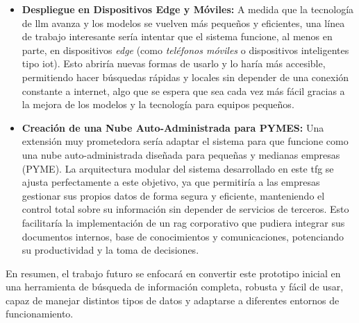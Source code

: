 \begin{itemize}
\item \textbf{Despliegue en Dispositivos Edge y Móviles:} A medida que la tecnología de \gls{llm} avanza y los modelos se vuelven más pequeños y eficientes, una línea de trabajo interesante sería intentar que el sistema funcione, al menos en parte, en dispositivos \textit{edge} (como \textit{teléfonos móviles} o dispositivos inteligentes tipo \gls{iot}). Esto abriría nuevas formas de usarlo y lo haría más accesible, permitiendo hacer búsquedas rápidas y locales sin depender de una conexión constante a internet, algo que se espera que sea cada vez más fácil gracias a la mejora de los modelos y la tecnología para equipos pequeños.
\item \textbf{Creación de una Nube Auto-Administrada para PYMES:} Una extensión muy prometedora sería adaptar el sistema para que funcione como una nube auto-administrada diseñada para pequeñas y medianas empresas (PYME). La arquitectura modular del sistema desarrollado en este \gls{tfg} se ajusta perfectamente a este objetivo, ya que permitiría a las empresas gestionar sus propios datos de forma segura y eficiente, manteniendo el control total sobre su información sin depender de servicios de terceros. Esto facilitaría la implementación de un \gls{rag} corporativo que pudiera integrar sus documentos internos, base de conocimientos y comunicaciones, potenciando su productividad y la toma de decisiones.
\end{itemize}

En resumen, el trabajo futuro se enfocará en convertir este prototipo inicial en una herramienta de búsqueda de información completa, robusta y fácil de usar, capaz de manejar distintos tipos de datos y adaptarse a diferentes entornos de funcionamiento.